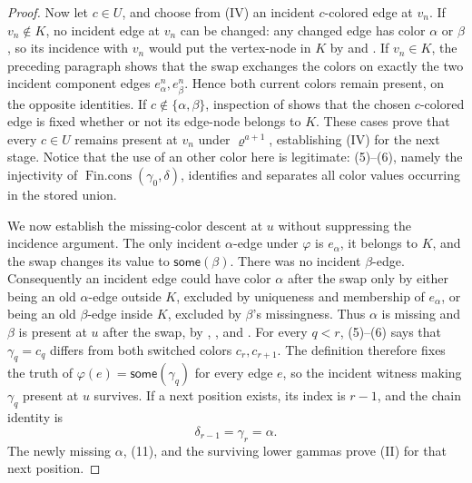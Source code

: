 \begin{proof}
Now let \(c\in U\), and choose from (IV) an incident \(c\)-colored edge at
\(v_n\).  If \(v_n\notin K\), no incident edge at \(v_n\) can be changed:
any changed edge has color \(\alpha\) or \(\beta\), so its incidence with
\(v_n\) would put the vertex-node in \(K\) by
 and
.  If \(v_n\in K\), the preceding paragraph
shows that the swap exchanges the colors on exactly the two incident
component edges \(e_\alpha^n,e_\beta^n\).  Hence both current colors
remain present, on the opposite identities.  If
\(c\notin\{\alpha,\beta\}\), inspection of
 shows that the chosen \(c\)-colored edge
is fixed whether or not its edge-node belongs to \(K\).  These cases prove
that every \(c\in U\) remains present at \(v_n\) under
\(\varrho^{a+1}\), establishing (IV) for the next stage.  Notice that
the use of an other color here is legitimate: (5)--(6), namely the
injectivity of \(\operatorname{Fin.cons}(\gamma_0,\delta)\), identifies
and separates all color values occurring in the stored union.

We now establish the missing-color descent at \(u\) without suppressing
the incidence argument.  The only incident \(\alpha\)-edge under
\(\varphi\) is \(e_\alpha\), it belongs to \(K\), and the swap changes its
value to \(\mathsf{some}(\beta)\).  There was no incident \(\beta\)-edge.
Consequently an incident edge could have color \(\alpha\) after the swap
only by either being an old \(\alpha\)-edge outside \(K\), excluded by
uniqueness and membership of \(e_\alpha\), or being an old \(\beta\)-edge
inside \(K\), excluded by \(\beta\)'s missingness.  Thus \(\alpha\) is
missing and \(\beta\) is present at \(u\) after the swap, by
, , and
.  For every \(q<r\), (5)--(6) says that
\(\gamma_q=c_q\) differs from both switched colors \(c_r,c_{r+1}\).
The definition  therefore fixes the truth
of \(\varphi(e)=\mathsf{some}(\gamma_q)\) for every edge \(e\), so the
incident witness making \(\gamma_q\) present at \(u\) survives.  If a
next position exists, its index is \(r-1\), and the chain identity is
\[
              \delta_{r-1}=\gamma_r=\alpha .                 \tag{11}
\]
The newly missing \(\alpha\), (11), and the surviving lower gammas prove
(II) for that next position.


\end{proof}
